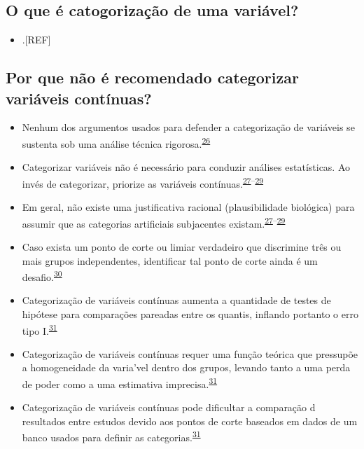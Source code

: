 \documentclass[
]{book}
\providecommand{\tightlist}{%
  \setlength{\itemsep}{0pt}\setlength{\parskip}{0pt}}
\begin{document}
\hypertarget{o-que-uxe9-catogorizauxe7uxe3o-de-uma-variuxe1vel}{%
\subsection{O que é catogorização de uma variável?}\label{o-que-uxe9-catogorizauxe7uxe3o-de-uma-variuxe1vel}}

\begin{itemize}
\tightlist
\item
  .{[}REF{]}
\end{itemize}

\hypertarget{por-que-nuxe3o-uxe9-recomendado-categorizar-variuxe1veis-contuxednuas}{%
\subsection{Por que não é recomendado categorizar variáveis contínuas?}\label{por-que-nuxe3o-uxe9-recomendado-categorizar-variuxe1veis-contuxednuas}}

\begin{itemize}
\item
  Nenhum dos argumentos usados para defender a categorização de variáveis se sustenta sob uma análise técnica rigorosa.\textsuperscript{\protect\hyperlink{ref-MacCallum2002}{26}}
\item
  Categorizar variáveis não é necessário para conduzir análises estatísticas. Ao invés de categorizar, priorize as variáveis contínuas.\textsuperscript{\protect\hyperlink{ref-Altman2006}{27}--\protect\hyperlink{ref-Collins2016}{29}}
\item
  Em geral, não existe uma justificativa racional (plausibilidade biológica) para assumir que as categorias artificiais subjacentes existam.\textsuperscript{\protect\hyperlink{ref-Altman2006}{27}--\protect\hyperlink{ref-Collins2016}{29}}
\item
  Caso exista um ponto de corte ou limiar verdadeiro que discrimine três ou mais grupos independentes, identificar tal ponto de corte ainda é um desafio.\textsuperscript{\protect\hyperlink{ref-Prince2017}{30}}
\item
  Categorização de variáveis contínuas aumenta a quantidade de testes de hipótese para comparações pareadas entre os quantis, inflando portanto o erro tipo I.\textsuperscript{\protect\hyperlink{ref-Bennette2012}{31}}
\item
  Categorização de variáveis contínuas requer uma função teórica que pressupõe a homogeneidade da varia'vel dentro dos grupos, levando tanto a uma perda de poder como a uma estimativa imprecisa.\textsuperscript{\protect\hyperlink{ref-Bennette2012}{31}}
\item
  Categorização de variáveis contínuas pode dificultar a comparação d resultados entre estudos devido aos pontos de corte baseados em dados de um banco usados para definir as categorias.\textsuperscript{\protect\hyperlink{ref-Bennette2012}{31}}
\end{itemize}
\end{document}
